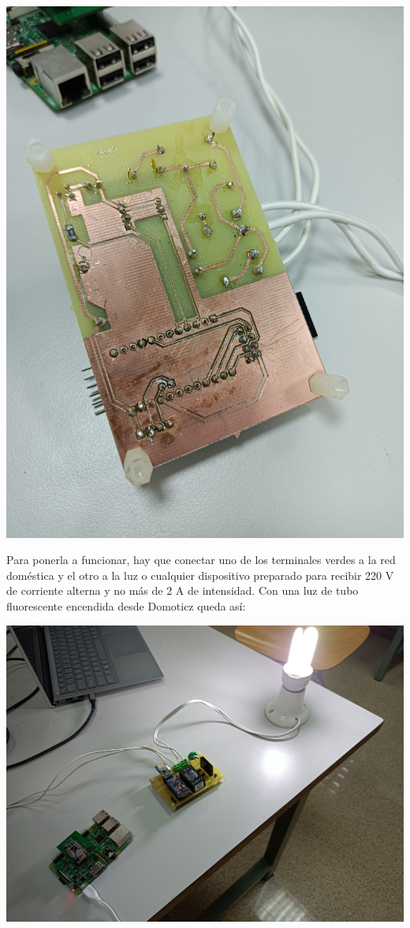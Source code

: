 \includegraphics[width=\linewidth]{pcb-back.jpg}

Para ponerla a funcionar, hay que conectar uno de los terminales verdes a la
red doméstica y el otro a la luz o cualquier dispositivo preparado para
recibir 220 V de corriente alterna y no más de 2 A de intensidad. Con una luz
de tubo fluorescente encendida desde Domoticz queda así:

\includegraphics[width=\linewidth]{pcb-light-on.jpg}